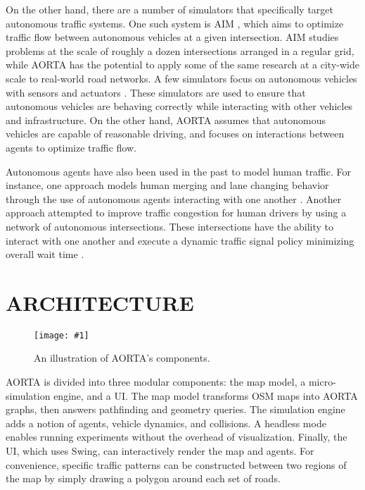 \documentclass[letterpaper, 10 pt, conference]{ieeeconf}  %
\newcommand{\pix}[3]{
  \begin{figure}[h]
    \centering \texttt{[image: \#1]}
    \caption{#2}
  \end{figure}
}
\begin{document}
On the other hand, there are a number of simulators that specifically
target autonomous traffic systems. One such system is AIM
\cite{JAIR08-dresner}, which aims to optimize traffic flow between
autonomous vehicles at a given intersection. AIM studies problems at
the scale of roughly a dozen intersections arranged in a regular grid,
while AORTA has the potential to apply some of the same research at a
city-wide scale to real-world road networks. A few simulators focus on
autonomous vehicles with sensors and actuators
\cite{figueiredo2009approach}. These simulators are used to ensure
that autonomous vehicles are behaving correctly while interacting with
other vehicles and infrastructure. On the other hand, AORTA assumes
that autonomous vehicles are capable of reasonable driving, and
focuses on interactions between agents to optimize traffic flow.

Autonomous agents have also been used in the past to model human
traffic. For instance, one approach models human merging and lane
changing behavior through the use of autonomous agents interacting
with one another \cite{hidas2002modelling}. Another approach attempted
to improve traffic congestion for human drivers by using a network of
autonomous intersections.  These intersections have the ability to
interact with one another and execute a dynamic traffic signal policy
minimizing overall wait time \cite{manikonda2001autonomous}.



\section{ARCHITECTURE}


\pix{architecture.png}
    {An illustration of AORTA's components.}
    {scale=0.2}

AORTA is divided into three modular components: the map model, a
micro-simulation engine, and a UI. The map model transforms OSM maps into AORTA
graphs, then answers pathfinding and geometry queries. The simulation engine
adds a notion of agents, vehicle dynamics, and collisions. A headless mode
enables running experiments without the overhead of visualization. Finally, the
UI, which uses Swing, can interactively render the map and agents. For
convenience, specific traffic patterns can be constructed between two regions of
the map by simply drawing a polygon around each set of roads.
\end{document}
